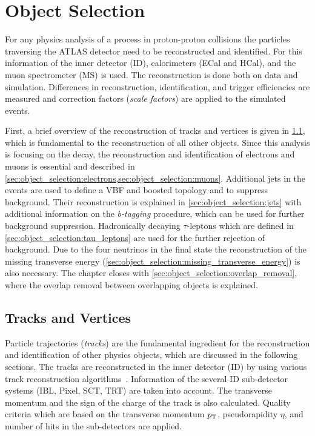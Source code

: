 \chapter{Object Selection}\label{cha:object_selection}

For any physics analysis of a process in proton-proton collisions the particles traversing the ATLAS detector
need to be reconstructed and identified.
For this information of the inner detector (ID), calorimeters (ECal and HCal), and the muon spectrometer (MS) is used.
The reconstruction is done both on data and simulation. Differences in reconstruction, identification, and trigger efficiencies are
measured and correction factors (\emph{scale factors}) are applied to the simulated events.

First, a brief overview of the reconstruction of tracks and vertices is given in \cref{sec:object_selection:tracks_and_vertices}, which
is fundamental to the reconstruction of all other objects.
Since this analysis is focusing on the \Httllfull{} decay, the reconstruction and identification of electrons and muons
is essential and described in \cref{sec:object_selection:electrons,sec:object_selection:muons}.
Additional jets in the events are used to define a VBF and boosted topology  and to suppress background.
Their reconstruction is explained in \cref{sec:object_selection:jets} with additional information on the
\emph{b-tagging} procedure, which can be used for further background suppression.
Hadronically decaying $\tau$-leptons which are defined in \cref{sec:object_selection:tau_leptons} are used for the further rejection of background.
Due to the four neutrinos in the final state the reconstruction of the missing transverse energy (\cref{sec:object_selection:missing_transverse_energy})
is also necessary.
The chapter closes with \cref{sec:object_selection:overlap_removal}, where the overlap removal between overlapping objects is explained.

\section{Tracks and Vertices}\label{sec:object_selection:tracks_and_vertices}

Particle trajectories (\emph{tracks}) are the fundamental ingredient for the reconstruction and identification
of other physics objects, which are discussed in the following sections.
The tracks are reconstructed in the inner detector (ID) by using various track reconstruction algorithms~\cite{ATL-SOFT-PUB-2007-007}.
Information of the several ID sub-detector systems (IBL, Pixel, SCT, TRT) are taken into account.
The transverse momentum and the sign of the charge of the track is also calculated.
Quality criteria which are based on the transverse momentum $p_\text{T}$, pseudorapidity $\eta$, and number of hits
in the sub-detectors are applied.

